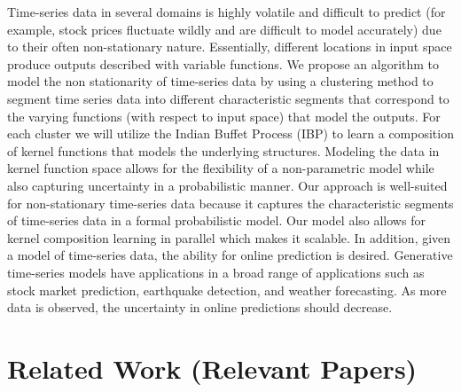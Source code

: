 \documentclass{article}
\begin{document}
Time-series data in several domains is highly volatile and difficult to predict (for example, stock prices fluctuate wildly and are difficult to model accurately) due to their often non-stationary nature. Essentially, different locations in input space produce outputs described with variable functions. We propose an algorithm to model the non stationarity of time-series data by using a clustering method to segment time series data into different characteristic segments that correspond to the varying functions (with respect to input space) that model the outputs. For each cluster we will utilize the Indian Buffet Process (IBP) to learn a composition of kernel functions that models the underlying structures. Modeling the data in kernel function space allows for the flexibility of a non-parametric model while also capturing uncertainty in a probabilistic manner. Our approach is well-suited for non-stationary time-series data because it captures the characteristic segments of time-series data in a formal probabilistic model. Our model also allows for kernel composition learning in parallel which makes it scalable. In addition, given a model of time-series data, the ability for online prediction is desired. Generative time-series models have applications in a broad range of applications such as stock market prediction, earthquake detection, and weather forecasting. As more data is observed, the uncertainty in online predictions should decrease.

\section{Related Work (Relevant Papers)} 
 
\end{document}
